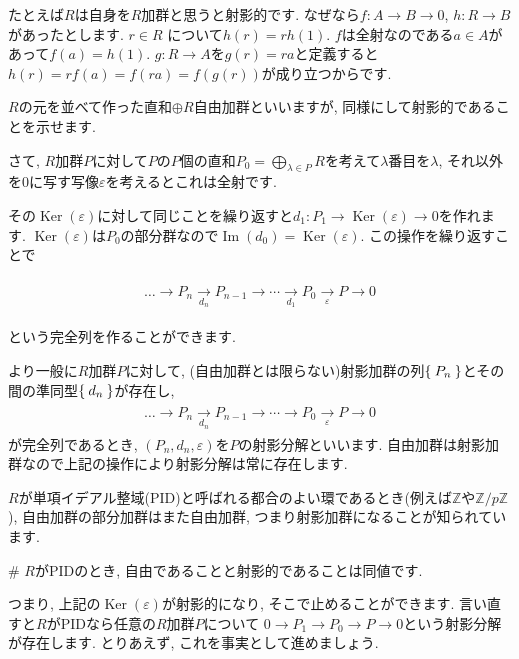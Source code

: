 \documentclass{jsarticle}
\newcommand{\ZZ}{\mathbb{Z}}
\newcommand{\makeop}[1]{\mathop{\mathrm{#1}}\nolimits}
\def\Im{\makeop{Im}}
\def\Ker{\makeop{Ker}}
\theoremstyle{definition}
\numberwithin{theorem}{section}
\begin{document}
たとえば$R$は自身を$R$加群と思うと射影的です. なぜなら$f: A\rightarrow B\rightarrow 0$, $h: R \rightarrow B$があったとします.
$r\in R$ について$h(r) = rh(1)$. $f$は全射なのである$a\in A$があって$f(a) = h(1)$. $g:R \rightarrow A$を$g(r) = ra$と定義すると
$h(r) = rf(a) = f(ra) = f(g(r))$が成り立つからです.

$R$の元を並べて作った直和$\oplus R$自由加群といいますが, 同様にして射影的であることを示せます.

さて, $R$加群$P$に対して$P$の$P$個の直和$\displaystyle P_0 = \bigoplus_{\lambda\in P} R$を考えて$\lambda$番目を$\lambda$, それ以外を0に写す写像$\varepsilon$を考えるとこれは全射です.

その$\Ker(\varepsilon)$に対して同じことを繰り返すと$d_1: P_1 \rightarrow \Ker(\varepsilon) \rightarrow 0$を作れます.
$\Ker(\varepsilon)$は$P_0$の部分群なので$\Im(d_0) = \Ker(\varepsilon)$. この操作を繰り返すことで


\begin{eqnarray*}
\begin{aligned}
\ldots \rightarrow P_n \xrightarrow[d_n]{} P_{n-1} \rightarrow \cdots \xrightarrow[d_1]{} P_0 \xrightarrow[\varepsilon]{} P \rightarrow 0
\end{aligned}
\end{eqnarray*}

という完全列を作ることができます.

より一般に$R$加群$P$に対して, (自由加群とは限らない)射影加群の列$\Set{P_n}$とその間の準同型$\Set{d_n}$が存在し, 
\begin{eqnarray*}
\begin{aligned}
\ldots \rightarrow P_n \xrightarrow[d_n]{} P_{n-1} \rightarrow \cdots \rightarrow P_0 \xrightarrow[\varepsilon]{} P \rightarrow 0
\end{aligned}
\end{eqnarray*}
が完全列であるとき, $(P_n, d_n, \varepsilon)$を$P$の射影分解といいます. 自由加群は射影加群なので上記の操作により射影分解は常に存在します.

$R$が単項イデアル整域(PID)と呼ばれる都合のよい環であるとき(例えば$\ZZ$や$\ZZ/p\ZZ$), 自由加群の部分加群はまた自由加群, つまり射影加群になることが知られています.

\# $R$がPIDのとき, 自由であることと射影的であることは同値です.

つまり, 上記の$\Ker(\varepsilon)$が射影的になり, そこで止めることができます. 言い直すと$R$がPIDなら任意の$R$加群$P$について
$0\rightarrow P_1 \rightarrow P_0 \rightarrow P \rightarrow 0$という射影分解が存在します. とりあえず, これを事実として進めましょう.
\end{document}
